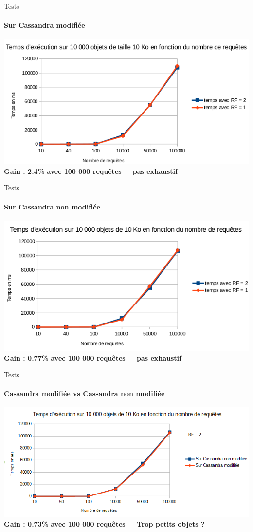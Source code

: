 \documentclass{beamer}
\begin{document}
\begin{frame}{Tests}
\framesubtitle{Sur Cassandra modifiée}
\centering
    \includegraphics[scale=0.6]{PAF-RF-PO} \\
    \textbf{Gain : 2.4\% avec 100 000 requêtes = pas exhaustif}
\end{frame}

\begin{frame}{Tests}
\framesubtitle{Sur Cassandra non modifiée}
\centering
    \includegraphics[scale=0.6]{cassandra_non_modif-RF-PO} \\
    \textbf{Gain : 0.77\% avec 100 000 requêtes = pas exhaustif}
\end{frame}


\begin{frame}{Tests}
\framesubtitle{Cassandra modifiée vs Cassandra non modifiée}
\centering
    \includegraphics[scale=0.6]{PAF-CNMCM-RF2PO} \\
    \textbf{Gain : 0.73\% avec 100 000 requêtes = Trop petits objets ?}
\end{frame}
\end{document}
